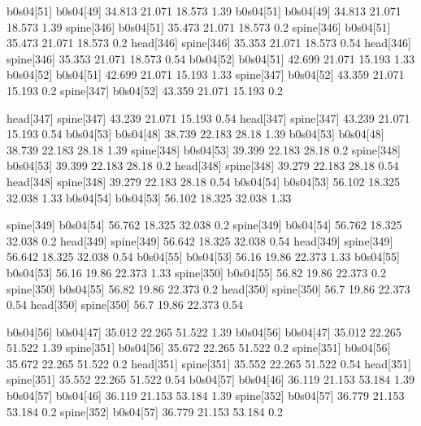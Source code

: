 b0s04[51]    b0s04[49]    34.813    21.071    18.573    1.39
b0s04[51]    b0s04[49]    34.813    21.071    18.573    1.39
spine[346]    b0s04[51]    35.473    21.071    18.573    0.2
spine[346]    b0s04[51]    35.473    21.071    18.573    0.2
head[346]    spine[346]    35.353    21.071    18.573    0.54
head[346]    spine[346]    35.353    21.071    18.573    0.54
b0s04[52]    b0s04[51]    42.699    21.071    15.193    1.33
b0s04[52]    b0s04[51]    42.699    21.071    15.193    1.33
spine[347]    b0s04[52]    43.359    21.071    15.193    0.2
spine[347]    b0s04[52]    43.359    21.071    15.193    0.2


head[347]    spine[347]    43.239    21.071    15.193    0.54
head[347]    spine[347]    43.239    21.071    15.193    0.54
b0s04[53]    b0s04[48]    38.739    22.183    28.18    1.39
b0s04[53]    b0s04[48]    38.739    22.183    28.18    1.39
spine[348]    b0s04[53]    39.399    22.183    28.18    0.2
spine[348]    b0s04[53]    39.399    22.183    28.18    0.2
head[348]    spine[348]    39.279    22.183    28.18    0.54
head[348]    spine[348]    39.279    22.183    28.18    0.54
b0s04[54]    b0s04[53]    56.102    18.325    32.038    1.33
b0s04[54]    b0s04[53]    56.102    18.325    32.038    1.33


spine[349]    b0s04[54]    56.762    18.325    32.038    0.2
spine[349]    b0s04[54]    56.762    18.325    32.038    0.2
head[349]    spine[349]    56.642    18.325    32.038    0.54
head[349]    spine[349]    56.642    18.325    32.038    0.54
b0s04[55]    b0s04[53]    56.16    19.86    22.373    1.33
b0s04[55]    b0s04[53]    56.16    19.86    22.373    1.33
spine[350]    b0s04[55]    56.82    19.86    22.373    0.2
spine[350]    b0s04[55]    56.82    19.86    22.373    0.2
head[350]    spine[350]    56.7    19.86    22.373    0.54
head[350]    spine[350]    56.7    19.86    22.373    0.54


b0s04[56]    b0s04[47]    35.012    22.265    51.522    1.39
b0s04[56]    b0s04[47]    35.012    22.265    51.522    1.39
spine[351]    b0s04[56]    35.672    22.265    51.522    0.2
spine[351]    b0s04[56]    35.672    22.265    51.522    0.2
head[351]    spine[351]    35.552    22.265    51.522    0.54
head[351]    spine[351]    35.552    22.265    51.522    0.54
b0s04[57]    b0s04[46]    36.119    21.153    53.184    1.39
b0s04[57]    b0s04[46]    36.119    21.153    53.184    1.39
spine[352]    b0s04[57]    36.779    21.153    53.184    0.2
spine[352]    b0s04[57]    36.779    21.153    53.184    0.2


